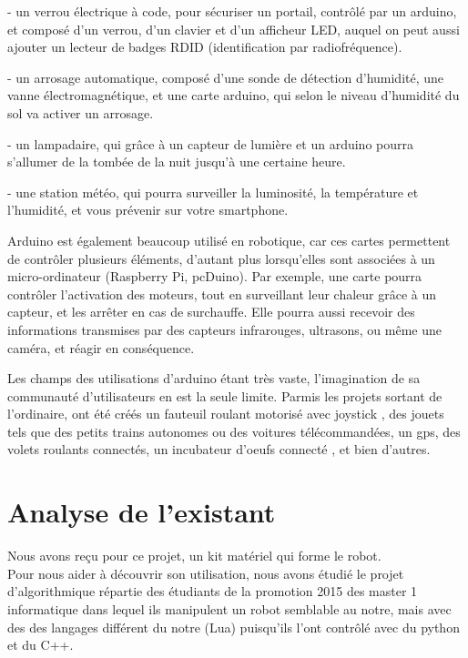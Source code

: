 \documentclass[12pt,francais]{report}
\begin{document}
- un verrou électrique à code, pour sécuriser un portail, contrôlé par un arduino, et composé d'un verrou, d'un clavier et d'un afficheur LED, auquel on peut aussi ajouter un lecteur de badges RDID (identification par radiofréquence).

- un arrosage automatique, composé d'une sonde de détection d'humidité, une vanne électromagnétique, et une carte arduino, qui selon le niveau d'humidité du sol va activer un arrosage.

- un lampadaire, qui grâce à un capteur de lumière et un arduino pourra s'allumer de la tombée de la nuit jusqu'à une certaine heure.

- une station météo, qui pourra surveiller la luminosité, la température et l'humidité, et vous prévenir sur votre smartphone.

Arduino est également beaucoup utilisé en robotique, car ces cartes permettent de contrôler plusieurs éléments, d'autant plus lorsqu'elles sont associées à un micro-ordinateur (Raspberry Pi, pcDuino). Par exemple, une carte pourra contrôler l'activation des moteurs, tout en surveillant leur chaleur grâce à un capteur, et les arrêter en cas de surchauffe. Elle pourra aussi recevoir des informations transmises par des capteurs infrarouges, ultrasons, ou même une caméra, et réagir en conséquence. \cite{ref22}

Les champs des utilisations d'arduino étant très vaste, l'imagination de sa communauté d'utilisateurs en est la seule limite. Parmis les projets sortant de l'ordinaire, ont été créés un fauteuil roulant motorisé avec joystick \cite{ref23}, des jouets tels que des petits trains autonomes ou des voitures télécommandées, un gps, des volets roulants connectés, un incubateur d'oeufs connecté \cite{ref24}, et bien d'autres.


\newpage
\section*{Analyse de l'existant}

Nous avons reçu pour ce projet, un kit matériel qui forme le robot.\\
Pour nous aider à découvrir son utilisation, nous avons étudié le projet d'algorithmique répartie des étudiants de la promotion 2015 des master 1 informatique \cite{ref1} dans lequel ils manipulent un robot semblable au notre, mais avec des des langages différent du notre (Lua) puisqu'ils l'ont contrôlé avec du python et du C++.
\end{document}
